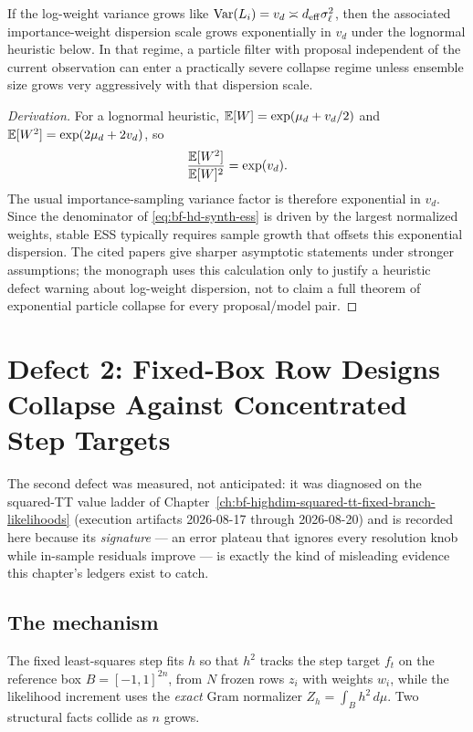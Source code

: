 \begin{proposition}
\label{prop:bf-hd-particle-collapse-calculus}
If the log-weight variance grows like
\(\operatorname{Var}(L_i)=v_d\asymp d_{\mathrm{eff}}\sigma_\ell^2\), then the associated
importance-weight dispersion scale grows exponentially in \(v_d\) under the
lognormal heuristic below.  In that regime, a particle filter with proposal
independent of the current observation can enter a practically severe collapse
regime unless ensemble size grows very aggressively with that dispersion scale.
\end{proposition}

\begin{proof}[Derivation]
For a lognormal heuristic, \(\mathbb{E}[W]=\exp(\mu_d+v_d/2)\) and
\(\mathbb{E}[W^2]=\exp(2\mu_d+2v_d)\), so
\[
  \frac{\mathbb{E}[W^2]}{\mathbb{E}[W]^2}=\exp(v_d).
\]
The usual importance-sampling variance factor is therefore exponential in
\(v_d\).  Since the denominator of \eqref{eq:bf-hd-synth-ess} is driven by the
largest normalized weights, stable ESS typically requires sample growth that
offsets this exponential dispersion.  The cited papers give sharper asymptotic
statements under stronger assumptions; the monograph uses this calculation only
to justify a heuristic defect warning about log-weight dispersion, not to claim a
full theorem of exponential particle collapse for every proposal/model pair.
\end{proof}

\section[Row-Coverage Collapse]{Defect 2: Fixed-Box Row Designs Collapse Against Concentrated Step Targets}
\label{sec:bf-hd-defect-row-coverage}

The second defect was measured, not anticipated: it was diagnosed on the
squared-TT value ladder of Chapter~\ref{ch:bf-highdim-squared-tt-fixed-branch-likelihoods}
(execution artifacts 2026-08-17 through 2026-08-20) and is recorded here
because its \emph{signature} --- an error plateau that ignores every
resolution knob while in-sample residuals improve --- is exactly the kind of
misleading evidence this chapter's ledgers exist to catch.

\subsection{The mechanism}

The fixed least-squares step fits \(h\) so that \(h^2\) tracks the step
target \(f_t\) on the reference box \(B=[-1,1]^{2n}\), from \(N\) frozen
rows \(z_i\) with weights \(w_i\), while the likelihood increment uses the
\emph{exact} Gram normalizer \(Z_h=\int_B h^2\,d\mu\).  Two structural facts
collide as \(n\) grows.


